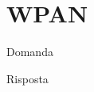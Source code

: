 \section{WPAN}

\begin{questions}
    \question Domanda
    
    \begin{solution}
        Risposta
    \end{solution}
\end{questions}
